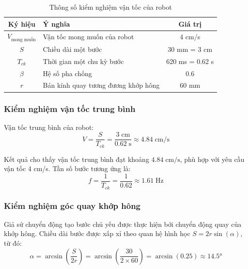             \begin{table}[H]
            \centering
            \caption{Thông số kiểm nghiệm vận tốc của robot}
            \begin{tabular}{|c|l|c|}
            \hline
            \textbf{Ký hiệu} & \textbf{Ý nghĩa} & \textbf{Giá trị} \\
            \hline
            $V_\text{mong muốn}$ & Vận tốc mong muốn của robot & 4 cm/s \\
            \hline
            $S$ & Chiều dài một bước & 30 mm = 3 cm \\
            \hline
            $T_{ck}$ & Thời gian một chu kỳ bước & 620 ms = 0.62 s \\
            \hline
            $\beta$ & Hệ số pha chống & 0.6 \\
            \hline
            $r$ & Bán kính quay tương đương khớp hông & 60 mm \\
            \hline
            \end{tabular}
            \end{table}

            \subsubsection{Kiểm nghiệm vận tốc trung bình}

            \hspace{0.5cm} Vận tốc trung bình của robot:
            \begin{equation}
                V = \frac{S}{T_{ck}} = \frac{3\;\text{cm}}{0.62\;\text{s}} \approx 4.84\;\text{cm/s}
            \end{equation}

            \hspace{0.5cm} Kết quả cho thấy vận tốc trung bình đạt khoảng $4.84\;\text{cm/s}$, phù hợp với yêu cầu vận tốc 4 cm/s. Tần số bước tương ứng là:
            \begin{equation}
                f = \frac{1}{T_{ck}} = \frac{1}{0.62} \approx 1.61\;\text{Hz}
            \end{equation}

            \subsubsection{Kiểm nghiệm góc quay khớp hông}

            \hspace{0.5cm} Giả sử chuyển động tạo bước chủ yếu được thực hiện bởi chuyển động quay của khớp hông. Chiều dài bước được xấp xỉ theo quan hệ hình học $S = 2r\sin(\alpha)$, từ đó:
            \begin{equation}
                \alpha = \arcsin\!\left(\frac{S}{2r}\right) = \arcsin\!\left(\frac{30}{2 \times 60}\right) = \arcsin(0.25) \approx 14.5°
            \end{equation}

